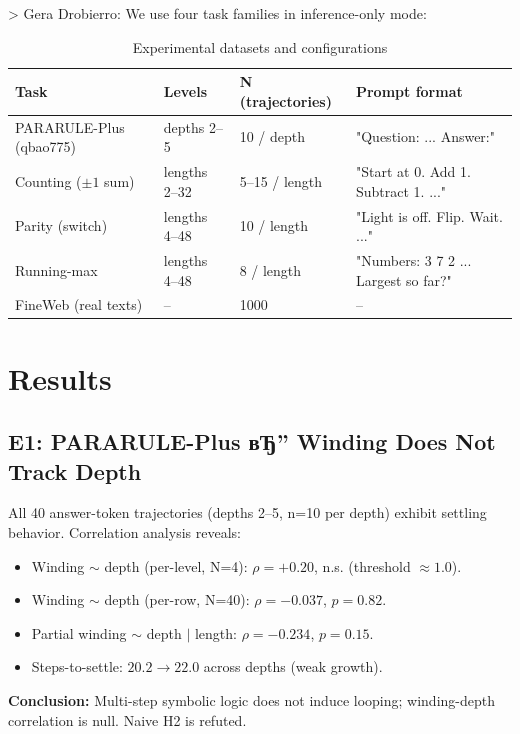 > Gera Drobierro:
We use four task families in inference-only mode:

\begin{table}[h]
\centering
\caption{Experimental datasets and configurations}
\begin{tabular}{llll}
\toprule
Task & Levels & N (trajectories) & Prompt format \\
\midrule
PARARULE-Plus (qbao775) & depths 2--5 & 10 / depth & "Question: ... Answer:" \\
Counting ($\pm1$ sum) & lengths 2--32 & 5--15 / length & "Start at 0. Add 1. Subtract 1. ..." \\
Parity (switch) & lengths 4--48 & 10 / length & "Light is off. Flip. Wait. ..." \\
Running-max & lengths 4--48 & 8 / length & "Numbers: 3 7 2 ... Largest so far?" \\
FineWeb (real texts) & -- & 1000 & -- \\
\bottomrule
\end{tabular}
\end{table}

\section{Results}

\subsection{E1: PARARULE-Plus вЂ” Winding Does Not Track Depth}

All 40 answer-token trajectories (depths 2--5, n=10 per depth) exhibit settling behavior. Correlation analysis reveals:

\begin{itemize}
    \item Winding $\sim$ depth (per-level, N=4): $\rho = +0.20$, n.s. (threshold $\approx 1.0$).
    \item Winding $\sim$ depth (per-row, N=40): $\rho = -0.037$, $p = 0.82$.
    \item Partial winding $\sim$ depth $|$ length: $\rho = -0.234$, $p = 0.15$.
    \item Steps-to-settle: $20.2 \rightarrow 22.0$ across depths (weak growth).
\end{itemize}

\textbf{Conclusion:} Multi-step symbolic logic does not induce looping; winding-depth correlation is null. Naive H2 is refuted.

